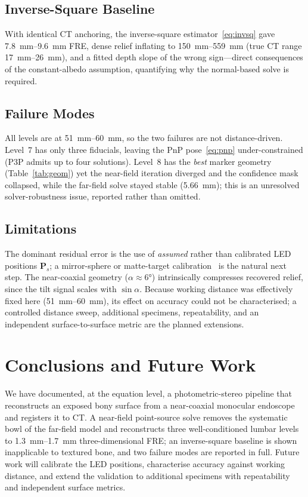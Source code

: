 \documentclass[journal]{IEEEtran}
\newcommand{\vP}{\bm{P}}
\begin{document}
\subsection{Inverse-Square Baseline}
With identical CT anchoring, the inverse-square estimator~\eqref{eq:invsq} gave
\SIrange{7.8}{9.6}{\milli\meter} FRE, dense relief inflating to
\SIrange{150}{559}{\milli\meter} (true CT range \SIrange{17}{26}{\milli\meter}), and a
fitted depth slope of the wrong sign---direct consequences of the constant-albedo
assumption, quantifying why the normal-based solve is required.

\subsection{Failure Modes}
All levels are at \SIrange{51}{60}{\milli\meter}, so the two failures are not
distance-driven. Level~7 has only three fiducials, leaving the PnP
pose~\eqref{eq:pnp} under-constrained (P3P admits up to four solutions). Level~8 has
the \emph{best} marker geometry (Table~\ref{tab:geom}) yet the near-field iteration
diverged and the confidence mask collapsed, while the far-field solve stayed stable
(\SI{5.66}{\milli\meter}); this is an unresolved solver-robustness issue, reported
rather than omitted.

\subsection{Limitations}
The dominant residual error is the use of \emph{assumed} rather than calibrated LED
positions $\vP_s$; a mirror-sphere or matte-target calibration~\cite{queau,aocalib} is
the natural next step. The near-coaxial geometry ($\alpha\approx\ang{6}$)
intrinsically compresses recovered relief, since the tilt signal scales with
$\sin\alpha$. Because working distance was effectively fixed here
(\SIrange{51}{60}{\milli\meter}), its effect on accuracy could not be characterised; a
controlled distance sweep, additional specimens, repeatability, and an independent
surface-to-surface metric are the planned extensions.

\section{Conclusions and Future Work}
We have documented, at the equation level, a photometric-stereo pipeline that
reconstructs an exposed bony surface from a near-coaxial monocular endoscope and
registers it to CT. A near-field point-source solve removes the systematic bowl of the
far-field model and reconstructs three well-conditioned lumbar levels to
\SIrange{1.3}{1.7}{\milli\meter} three-dimensional FRE; an inverse-square baseline is
shown inapplicable to textured bone, and two failure modes are reported in full. Future
work will calibrate the LED positions, characterise accuracy against working distance,
and extend the validation to additional specimens with repeatability and independent
surface metrics.
\end{document}
